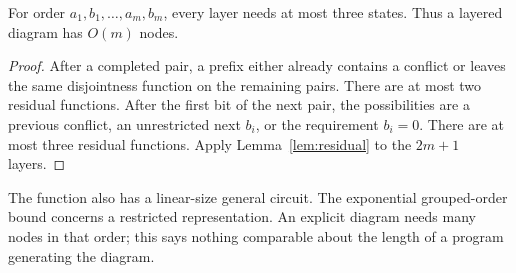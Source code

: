\begin{proposition}
\label{prop:interleaved}
For order \(a_1,b_1,\ldots,a_m,b_m\), every layer needs at most
three states. Thus a layered diagram has \(O(m)\) nodes.
\end{proposition}
\begin{proof}
After a completed pair, a prefix either already contains a conflict
or leaves the same disjointness function on the remaining pairs.
There are at most two residual functions. After the first bit of
the next pair, the possibilities are a previous conflict, an
unrestricted next \(b_i\), or the requirement \(b_i=0\).
There are at most three residual functions.
Apply Lemma~\ref{lem:residual} to the \(2m+1\) layers.
\end{proof}

The function also has a linear-size general circuit. The exponential
grouped-order bound concerns a restricted representation. An
explicit diagram needs many nodes in that order; this says nothing
comparable about the length of a program generating the diagram.

\begin{table}[htbp]
\centering

\caption{Exhaustive residual-function counts. Grouped cut is the width
after the first \(m\) bits; interleaved maximum includes all layers,
including terminals. Finite observations illustrate the proofs.}
\label{tab:widths}
\end{table}
